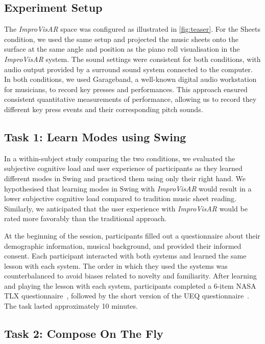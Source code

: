 \documentclass{vgtc}                          %
\begin{document}
\subsection{Experiment Setup}
\par The \textit{ImproVisAR} space was  configured as illustrated in \autoref{fig:teaser}. For the Sheets condition, we used the same setup and projected the music sheets onto the surface at the same angle and position as the piano roll visualisation in the \textit{ImproVisAR} system. The sound settings were consistent for both conditions, with audio output provided by a surround sound system connected to the computer. In both conditions, we used Garageband, a well-known digital audio workstation for musicians, to record key presses and performances. This approach ensured consistent quantitative  measurements of performance, allowing us to record they different key press events and their corresponding pitch sounds. 

\subsection{Task 1: Learn Modes using Swing}
In a within-subject study comparing the two conditions, we evaluated the subjective cognitive load and user experience of participants as they learned different modes in Swing and practiced them using only their right hand. We hypothesised that learning modes in Swing with \textit{ImproVisAR} would result in a lower subjective cognitive load compared to tradition music sheet reading. Similarly, we anticipated that the user experience with \textit{ImproVisAR} would be rated more favorably than the traditional approach. 

\par At the beginning of the session, participants filled out a questionnaire about their demographic information, musical background, and provided their informed consent. Each participant interacted with both systems and learned the same lesson with each system. The order in which they used the systems was counterbalanced to avoid biases related to novelty and familiarity. After learning and playing the lesson with each system, participants completed a 6-item NASA TLX questionnaire~\cite{hart1988development}, followed by the short version of the UEQ questionnaire~\cite{schrepp2017design}. The task lasted approximately 10 minutes. 

\subsection{Task 2: Compose On The Fly}
\end{document}
